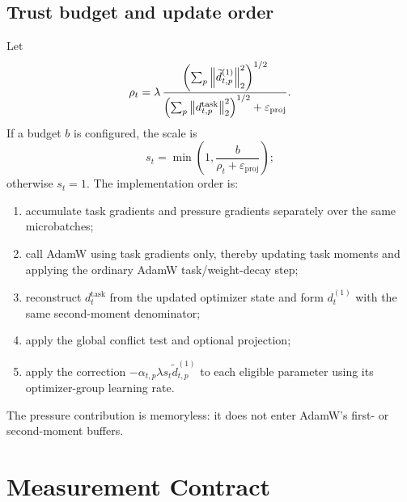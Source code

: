 \subsection{Trust budget and update order}

Let
\begin{equation}
    \rho_t
      =\lambda\,
       \frac{\left(\sum_p\left\lVert \widetilde d_{t,p}^{(1)}\right\rVert_2^2\right)^{1/2}}
            {\left(\sum_p\left\lVert d_{t,p}^{\mathrm{task}}\right\rVert_2^2\right)^{1/2}
             +\varepsilon_{\mathrm{proj}}}.
    \label{eq:trust-ratio-full}
\end{equation}
If a budget $b$ is configured, the scale is
\begin{equation}
    s_t=\min\left(1,\frac{b}{\rho_t+\varepsilon_{\mathrm{proj}}}\right);
    \label{eq:trust-scale-full}
\end{equation}
otherwise $s_t=1$. The implementation order is:
\begin{enumerate}
    \item accumulate task gradients and pressure gradients separately over the
          same microbatches;
    \item call AdamW using task gradients only, thereby updating task moments
          and applying the ordinary AdamW task/weight-decay step;
    \item reconstruct $d_t^{\mathrm{task}}$ from the updated optimizer state
          and form $d_t^{(1)}$ with the same second-moment denominator;
    \item apply the global conflict test and optional projection;
    \item apply the correction
          $-\alpha_{t,p}\lambda s_t\widetilde d_{t,p}^{(1)}$ to each eligible
          parameter using its optimizer-group learning rate.
\end{enumerate}
The pressure contribution is memoryless: it does not enter AdamW's first- or
second-moment buffers.

\section{Measurement Contract}
\label{app:measurement-contract}

